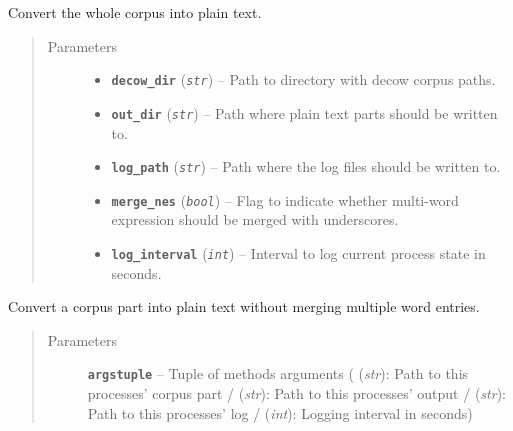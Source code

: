 \documentclass[letterpaper,10pt,english]{sphinxmanual}
\begin{document}
\begin{fulllineitems}
\label{src.prep.corpus:src.prep.corpus.convert_to_plain.convert_decow_to_plain}
Convert the whole corpus into plain text.
\begin{quote}\begin{description}
\item[{Parameters}] \leavevmode\begin{itemize}
\item {} 
\textbf{\texttt{decow\_dir}} (\emph{\texttt{str}}) -- Path to directory with decow corpus paths.

\item {} 
\textbf{\texttt{out\_dir}} (\emph{\texttt{str}}) -- Path where plain text parts should be written to.

\item {} 
\textbf{\texttt{log\_path}} (\emph{\texttt{str}}) -- Path where the log files should be written to.

\item {} 
\textbf{\texttt{merge\_nes}} (\emph{\texttt{bool}}) -- Flag to indicate whether multi-word expression should be merged with underscores.

\item {} 
\textbf{\texttt{log\_interval}} (\emph{\texttt{int}}) -- Interval to log current process state in seconds.

\end{itemize}

\end{description}\end{quote}

\end{fulllineitems}


\begin{fulllineitems}
\label{src.prep.corpus:src.prep.corpus.convert_to_plain.convert_part}
Convert a corpus part into plain text without merging multiple word entries.
\begin{quote}\begin{description}
\item[{Parameters}] \leavevmode
\textbf{\texttt{argstuple}} -- Tuple of methods arguments ( (\emph{str}): Path to this processes' corpus part / 
(\emph{str}): Path to this processes' output /  (\emph{str}): Path to this processes' log / 
(\emph{int}): Logging interval in seconds)

\end{description}\end{quote}

\end{fulllineitems}
\end{document}
